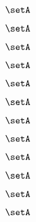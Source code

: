 \begin{forslides}
    \begin{equation}
        \label{eq:slides-translation-127}
        \setA
    \end{equation}

    \begin{equation}
        \label{eq:slides-translation-128}
        \setA
    \end{equation}

    \begin{equation}
        \label{eq:slides-translation-129}
        \setA
    \end{equation}
    
    \begin{equation}
        \label{eq:slides-translation-130}
        \setA
    \end{equation}

    \begin{equation}
        \label{eq:slides-translation-131}
        \setA
    \end{equation}

    \begin{equation}
        \label{eq:slides-translation-132}
        \setA
    \end{equation}

    \begin{equation}
        \label{eq:slides-translation-133}
        \setA
    \end{equation}

    \begin{equation}
        \label{eq:slides-translation-134}
        \setA
    \end{equation}

    \begin{equation}
        \label{eq:slides-translation-135}
        \setA
    \end{equation}

    \begin{equation}
        \label{eq:slides-translation-136}
        \setA
    \end{equation}

    \begin{equation}
        \label{eq:slides-translation-137}
        \setA
    \end{equation}

    \begin{equation}
        \label{eq:slides-translation-138}
        \setA
    \end{equation}


\end{forslides}
